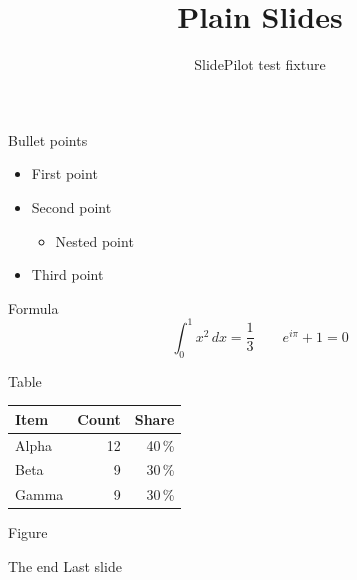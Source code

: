 \documentclass{beamer}
\title{Plain Slides}
\subtitle{SlidePilot test fixture}
\begin{document}
\begin{frame}
  \titlepage
\end{frame}

\begin{frame}{Bullet points}
  \begin{itemize}
    \item First point
    \item Second point
    \begin{itemize}
      \item Nested point
    \end{itemize}
    \item Third point
  \end{itemize}
\end{frame}

\begin{frame}{Formula}
  \[
    \int_{0}^{1} x^2 \, dx = \frac{1}{3}
    \qquad
    e^{i\pi} + 1 = 0
  \]
\end{frame}

\begin{frame}{Table}
  \centering
  \begin{tabular}{lrr}
    \hline
    Item & Count & Share \\
    \hline
    Alpha & 12 & 40\,\% \\
    Beta  & 9  & 30\,\% \\
    Gamma & 9  & 30\,\% \\
    \hline
  \end{tabular}
\end{frame}

\begin{frame}{Figure}
  \centering
\end{frame}

\begin{frame}{The end}
  \centering
  \Large Last slide
\end{frame}
\end{document}
